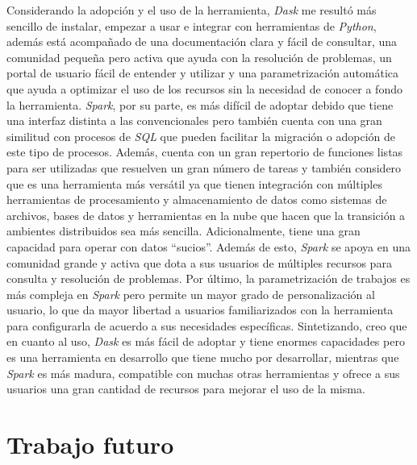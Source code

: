 Considerando la adopción y el uso de la herramienta, \textit{Dask} me resultó más sencillo de instalar, empezar a usar e integrar con herramientas de \textit{Python}, además está acompañado de una documentación clara y fácil de consultar, una comunidad pequeña pero activa que ayuda con la resolución de problemas, un portal de usuario fácil de entender y utilizar y una parametrización automática que ayuda a optimizar el uso de los recursos sin la necesidad de conocer a fondo la herramienta. \textit{Spark}, por su parte, es más difícil de adoptar debido que tiene una interfaz distinta a las convencionales pero también cuenta con una gran similitud con procesos de \textit{SQL} que pueden facilitar la migración o adopción de este tipo de procesos. Además, cuenta con un gran repertorio de funciones listas para ser utilizadas que resuelven un gran número de tareas y también considero que es una herramienta más versátil ya que tienen integración con múltiples herramientas de procesamiento y almacenamiento de datos como sistemas de archivos, bases de datos y herramientas en la nube que hacen que la transición a ambientes distribuidos sea más sencilla. Adicionalmente, tiene una gran capacidad para operar con datos ``sucios''. Además de esto, \textit{Spark} se apoya en una comunidad grande y activa que dota a sus usuarios de múltiples recursos para consulta y resolución de problemas. Por último, la parametrización de trabajos es más compleja en \textit{Spark} pero permite un mayor grado de personalización al usuario, lo que da mayor libertad a usuarios familiarizados con la herramienta para configurarla de acuerdo a sus necesidades específicas. Sintetizando, creo que en cuanto al uso, \textit{Dask} es más fácil de adoptar y tiene enormes capacidades pero es una herramienta en desarrollo que tiene mucho por desarrollar, mientras que \textit{Spark} es más madura, compatible con muchas otras herramientas y ofrece a sus usuarios una gran cantidad de recursos para mejorar el uso de la misma.
 


\section{Trabajo futuro}

